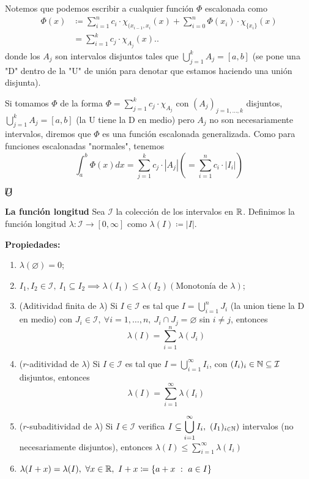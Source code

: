 \documentclass[a4paper]{report}
\newcommand{\bigcupcolon}{\mathop{\ThisStyle{%
  \ensurestackMath{\stackinset{c}{-0.4pt}{c}{+.25\LMex}{\tiny{D}}{\SavedStyle\bigcup}}}}}
\begin{document}
	Notemos que podemos escribir a cualquier función $\Phi$ escalonada como
	\begin{align*}
		\Phi (x) & \coloneq \sum_{i=1}^{n} c_i \cdot \chi_{(x_{i-1},x_i}(x) + \sum_{i=0}^{n} \Phi(x_i) \cdot \chi_{\{x_i\}}(x) \\
		& = \sum_{i=1}^{k} c_j \cdot \chi_{A_j}(x).
	.\end{align*}
	\noindent donde los $A_j$ son intervalos disjuntos tales que $\displaystyle\bigcup_{j=1}^{k} A_j = [a,b]$ (se pone una "D" dentro de la "U" de unión para denotar que estamos haciendo una unión disjunta).

	Si tomamos $\Phi$ de la forma $\Phi = \sum_{j=1}^{k} c_j \cdot \chi_{A_j}$ con $(A_j)_{j=1,\dots,k}$ disjuntos, $\displaystyle\bigcup_{j=1}^{k} A_j = [a,b]$ (la U tiene la D en medio) pero $A_j$  no son necesariamente intervalos, diremos que $\Phi$ es una función escalonada generalizada. Como para funciones escalonadas "normales", tenemos
	\[
	\int_{a}^{b} \Phi (x) dx = \sum_{j=1}^{k} c_j \cdot |A_j| \left( = \sum_{i=1}^{n} c_i \cdot |I_i| \right)
	\]

	$\bigcupcolon$

	\noindent \textbf{La función longitud}
	Sea $\mathcal{I}$ la colección de los intervalos en $\mathbb{R}$. Definimos la función longitud $\lambda : \mathcal{I} \to [0,\infty]$ como $\lambda (I) \coloneq |I|$.
	
	\noindent \textbf{Propiedades:}
	\begin{enumerate}
		\item $\lambda (\varnothing) = 0$;

		\item $I_1,I_2 \in \mathcal{I},\ I_1\subseteq I_2 \implies \lambda (I_1) \leq \lambda (I_2) (\text{Monotonía de } \lambda)$;

		\item (Aditividad finita de $\lambda$) Si $I \in \mathcal{I}$ es tal que $I = \displaystyle\bigcup_{i=1}^{n} J_i$ (la union tiene la D en medio) con $J_i \in \mathcal{I},\ \forall i = 1,\dots,n,\ J_i \cap J_j = \varnothing$ sin $i\neq j$, entonces
		\[
		\lambda (I) = \sum_{i=1}^{n} \lambda (J_i)
		\]

		\item ($r$-aditividad de $\lambda$) Si $I \in \mathcal{I}$ es tal que $I = \displaystyle\bigcup_{i=1}^{\infty} I_i $, con $(I_i)_{i} \in \mathbb{N} \subseteq \mathcal{I}$ disjuntos, entonces
		\[
		\lambda(I) = \sum_{i=1}^{\infty} \lambda (I_i)
		\]

		\item ($r$-subaditividad de $\lambda$) Si $I \in \mathcal{I}$ verifica $I \subseteq \displaystyle\bigcup_{i=1}^{\infty} I_i, \ (I_1)_{i \in \mathbb{N}})$ intervalos (no necesariamente disjuntos), entonces $\lambda (I) \leq \sum_{i=1}^{\infty} \lambda (I_i)$

		\item $\lambda (I + x) = \lambda (I), \ \forall x \in \mathbb{R}, \ I+x \coloneq \{a + x \ : \ a \in I \}  $
	\end{enumerate}



\end{document}
